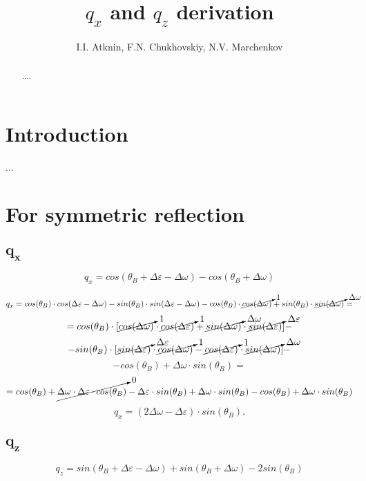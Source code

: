 \documentclass[10pt]{article}         %
\title{$q_x$ and $q_z$ derivation}
\author{I.I. Atknin, F.N. Chukhovskiy, N.V. Marchenkov}
\begin{document}
\maketitle

\begin{abstract}
....
\end{abstract}

\section{Introduction}
...

\section{For symmetric reflection}
\subsection{ $\pmb{q_x}$}
\begin{equation}
\label{eqn: distance}
	 q_x = cos(\theta_B + \Delta \varepsilon -  \Delta \omega) - cos(\theta_B +  \Delta \omega) 
\end{equation}


$$
	  q_x =  cos(\theta_B) \cdot cos(\Delta \varepsilon -  \Delta \omega) - sin(\theta_B)\cdot sin(\Delta \varepsilon -  \Delta \omega) - cos(\theta_B)\cdot \cancelto{1}{cos(\Delta \omega)} + sin(\theta_B) \cdot \cancelto{\Delta \omega}{sin(\Delta \omega)} =
$$
$$
	 = cos(\theta_B) \cdot [\cancelto{1}{cos(\Delta \omega)} \cdot \cancelto{1}{cos(\Delta \varepsilon)} + \cancelto{\Delta \omega}{sin(\Delta \omega)} \cdot \cancelto{\Delta \varepsilon}{sin(\Delta \varepsilon)}] - 
$$
$$
	 - sin(\theta_B) \cdot [\cancelto{\Delta \varepsilon}{sin(\Delta \varepsilon)} \cdot
	 \cancelto{1}{cos(\Delta \omega)} - \cancelto{1}{cos(\Delta \varepsilon)}  \cdot
	 \cancelto{\Delta \omega}{sin(\Delta \omega)}
	 ]  -
$$
$$
	- cos(\theta_B) +  \Delta \omega\cdot sin(\theta_B) = 
$$
$$
	= cos(\theta_B) + \cancelto{0}{ \Delta \omega \cdot \Delta \varepsilon \cdot cos(\theta_B) } 
	- \Delta \varepsilon \cdot sin(\theta_B) +  \Delta \omega\cdot sin(\theta_B) - cos(\theta_B) +  \Delta \omega\cdot sin(\theta_B) 
$$

\begin{equation}
	q_x = (2\Delta \omega -\Delta \varepsilon) \cdot sin(\theta_B).
\end{equation}

\subsection{ $\pmb{q_z}$}
\begin{equation}
	q_z = sin(\theta_B + \Delta \varepsilon -  \Delta \omega )+
	sin(\theta_B + \Delta \omega) - 2 sin(\theta_B)
\end{equation}
\end{document}
